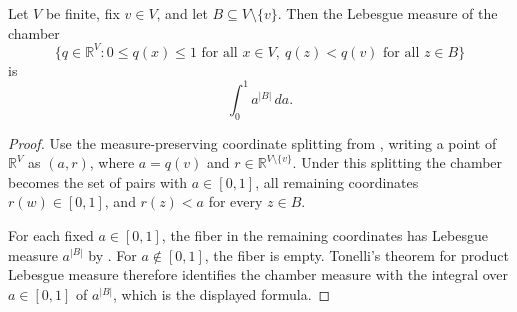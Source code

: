 \begin{helper}
Let \(V\) be finite, fix \(v\in V\), and let \(B\subseteq V\setminus\{v\}\).
Then the Lebesgue measure of the chamber
\[
\{q\in\mathbb R^V: 0\le q(x)\le 1\text{ for all }x\in V,\ 
q(z)<q(v)\text{ for all }z\in B\}
\]
is
\[
\int_0^1 a^{|B|}\,da .
\]
\end{helper}
\begin{proof}
Use the measure-preserving coordinate splitting from
, writing a point of
\(\mathbb R^V\) as \((a,r)\), where \(a=q(v)\) and
\(r\in\mathbb R^{V\setminus\{v\}}\).  Under this splitting the chamber becomes
the set of pairs with \(a\in[0,1]\), all remaining coordinates \(r(w)\in[0,1]\),
and \(r(z)<a\) for every \(z\in B\).

For each fixed \(a\in[0,1]\), the fiber in the remaining coordinates has
Lebesgue measure \(a^{|B|}\) by
.  For \(a\notin[0,1]\), the
fiber is empty.  Tonelli's theorem for product Lebesgue measure therefore
identifies the chamber measure with the integral over \(a\in[0,1]\) of
\(a^{|B|}\), which is the displayed formula.
\end{proof}
